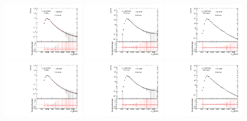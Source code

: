 \begin{figure}[htbp!]
\begin{center}
\includegraphics[angle=270, width=0.31\textwidth]{./figures/boosted/Syst_CRSB/SB_Small_compare_FourTag_qcd_hh.pdf}
\includegraphics[angle=270, width=0.31\textwidth]{./figures/boosted/Syst_CRSB/SB_Small_compare_ThreeTag_qcd_hh.pdf}
\includegraphics[angle=270, width=0.31\textwidth]{./figures/boosted/Syst_CRSB/SB_Small_compare_TwoTag_split_qcd_hh.pdf}
\includegraphics[angle=270, width=0.31\textwidth]{./figures/boosted/Syst_CRSB/SB_Large_compare_FourTag_qcd_hh.pdf}
\includegraphics[angle=270, width=0.31\textwidth]{./figures/boosted/Syst_CRSB/SB_Large_compare_ThreeTag_qcd_hh.pdf}
\includegraphics[angle=270, width=0.31\textwidth]{./figures/boosted/Syst_CRSB/SB_Large_compare_TwoTag_split_qcd_hh.pdf}

\end{center}
\end{figure}
